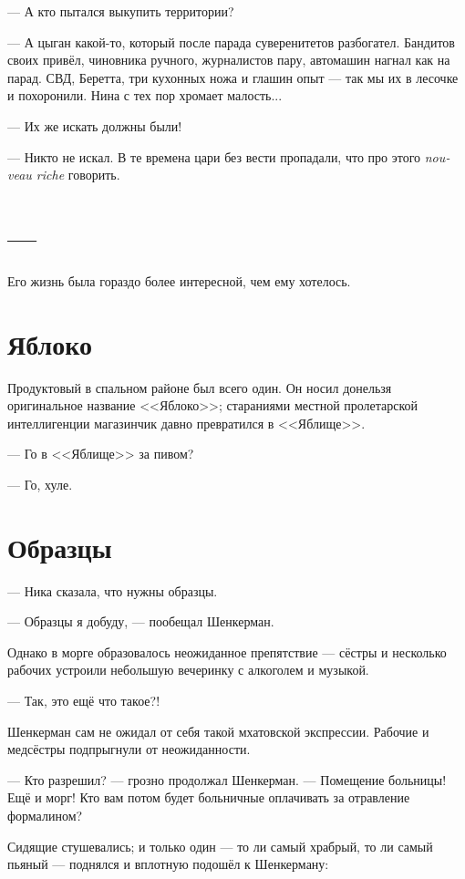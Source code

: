 \documentclass[a4paper,10pt,fleqn]{book}\usepackage{polyglossia}\setdefaultlanguage{english}\setotherlanguage{russian}\defaultfontfeatures{Ligatures=TeX,Mapping=tex-text} \usepackage{xcolor}\definecolor{lightgray}{HTML}{bbbbbb}\color{lightgray}\newcommand{\ml}[3]{\textcolor{black}{#3}}
\newcommand{\textspace}{\vspace{1em}{\centering\Large\bfseries<...>\par}\vspace{1em}}
\begin{document}
--- А кто пытался выкупить территории?

--- А цыган какой-то, который после парада суверенитетов разбогател.
Бандитов своих привёл, чиновника ручного, журналистов пару, автомашин нагнал как на парад.
СВД, Беретта, три кухонных ножа и глашин опыт --- так мы их в лесочке и похоронили.
Нина с тех пор хромает малость...

--- Их же искать должны были!

--- Никто не искал.
В те времена цари без вести пропадали, что про этого \textit{nouveau riche} говорить.

\section{---}

Его жизнь была гораздо более интересной, чем ему хотелось.

\section{Яблоко}

Продуктовый в спальном районе был всего один.
Он носил донельзя оригинальное название <<Яблоко>>;
стараниями местной пролетарской интеллигенции магазинчик давно превратился в <<Яблище>>.

--- Го в <<Яблище>> за пивом?

--- Го, хуле.

\section{Образцы}

--- Ника сказала, что нужны образцы.

--- Образцы я добуду, --- пообещал Шенкерман.

\textspace

Однако в морге образовалось неожиданное препятствие --- сёстры и несколько рабочих устроили небольшую вечеринку с алкоголем и музыкой.

--- Так, это ещё что такое?!

Шенкерман сам не ожидал от себя такой мхатовской экспрессии.
Рабочие и медсёстры подпрыгнули от неожиданности.

--- Кто разрешил? --- грозно продолжал Шенкерман.
--- Помещение больницы!
Ещё и морг!
Кто вам потом будет больничные оплачивать за отравление формалином?

Сидящие стушевались;
и только один --- то ли самый храбрый, то ли самый пьяный --- поднялся и вплотную подошёл к Шенкерману:
\end{document}
